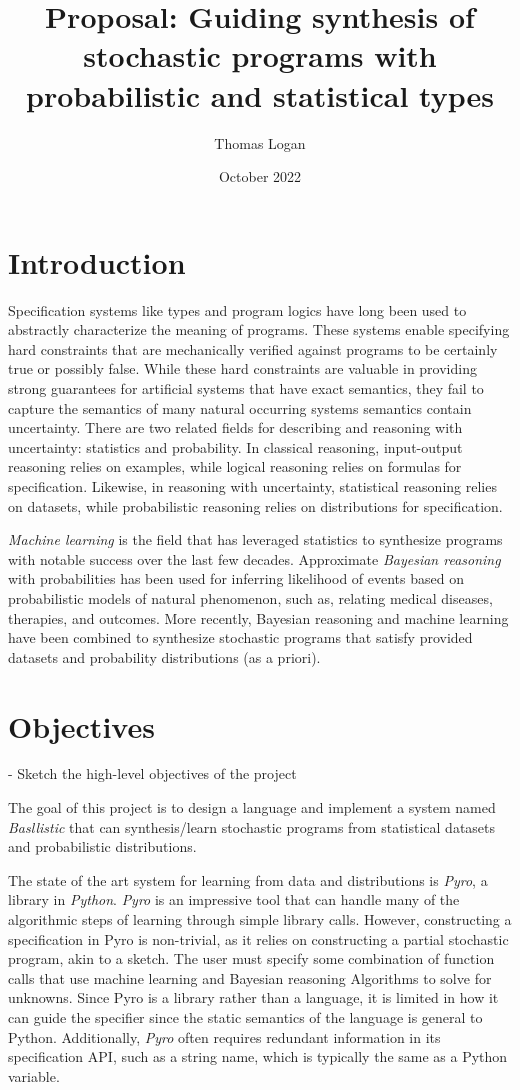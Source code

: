 \documentclass[manuscript]{acmart}
\title{Proposal: Guiding synthesis of stochastic programs with probabilistic and statistical types}
\author{Thomas Logan}
\date{October 2022}
\begin{document}
\maketitle

\section{Introduction}
Specification systems like types and program logics have long been used to abstractly characterize the meaning of programs.
These systems enable specifying hard constraints that are mechanically verified against programs to be certainly true or possibly false.
While these hard constraints are valuable in providing strong guarantees for artificial systems that have exact semantics, 
they fail to capture the semantics of many natural occurring systems semantics contain uncertainty.
There are two related fields for describing and reasoning with uncertainty: statistics and probability.
In classical reasoning, input-output reasoning relies on examples, while logical reasoning relies on formulas for specification.    
Likewise, in reasoning with uncertainty, statistical reasoning relies on datasets, while probabilistic reasoning relies on distributions for specification.


\emph{Machine learning} is the field that has leveraged statistics to synthesize programs with notable success over the last few decades.
Approximate \emph{Bayesian reasoning} with probabilities has been used for inferring likelihood of events based on probabilistic models
of natural phenomenon, such as, relating medical diseases, therapies, and outcomes. 
More recently, Bayesian reasoning and machine learning have been combined to synthesize stochastic programs that satisfy provided datasets and probability distributions (as a priori).



\section{Objectives}
- Sketch the high-level objectives of the project

The goal of this project is to design a language and implement a system named \emph{Basllistic} that can synthesis/learn stochastic programs from statistical datasets and probabilistic distributions.

The state of the art system for learning from data and distributions is \emph{Pyro}, a library in \emph{Python}. \emph{Pyro} is an impressive tool that can handle many  
of the algorithmic steps of learning through simple library calls. However, constructing a specification in Pyro is non-trivial, as it relies on constructing 
a partial stochastic program, akin to a sketch. The user must specify some combination of function calls that use machine learning and Bayesian reasoning Algorithms to
solve for unknowns. Since Pyro is a library rather than a language, it is limited in how it can guide the specifier since the static semantics of the language is general to Python. 
Additionally, \emph{Pyro} often requires redundant information in its specification API, such as a string name, which is typically the same as a Python variable. 
\end{document}
